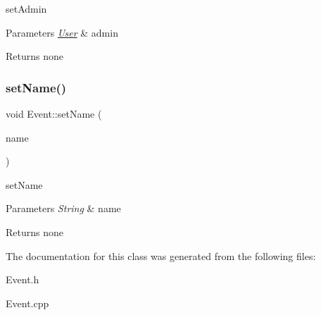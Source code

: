 set\+Admin 
\begin{DoxyParams}{Parameters}
{\em \mbox{\hyperlink{class_user}{User}}} & admin \\
\hline
\end{DoxyParams}
\begin{DoxyReturn}{Returns}
none 
\end{DoxyReturn}
\mbox{\label{class_event_a25fc700fb24ac3f0560732a183b9782c}} 
\subsubsection{\texorpdfstring{set\+Name()}{setName()}}
{\footnotesize\ttfamily void Event\+::set\+Name (\begin{DoxyParamCaption}\item[{std\+::string}]{name }\end{DoxyParamCaption})}

set\+Name 
\begin{DoxyParams}{Parameters}
{\em String} & name \\
\hline
\end{DoxyParams}
\begin{DoxyReturn}{Returns}
none 
\end{DoxyReturn}


The documentation for this class was generated from the following files\+:\begin{DoxyCompactItemize}
\item 
Event.\+h\item 
Event.\+cpp\end{DoxyCompactItemize}
